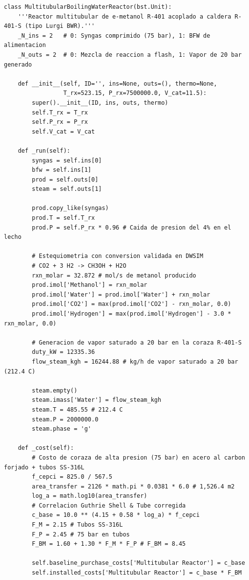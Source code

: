 \documentclass[11pt,letterpaper]{article}
\begin{document}
\begin{lstlisting}[caption={Clase personalizada MultitubularBoilingWaterReactor en BioSTEAM}]
class MultitubularBoilingWaterReactor(bst.Unit):
    '''Reactor multitubular de e-metanol R-401 acoplado a caldera R-401-S (tipo Lurgi BWR).'''
    _N_ins = 2   # 0: Syngas comprimido (75 bar), 1: BFW de alimentacion
    _N_outs = 2  # 0: Mezcla de reaccion a flash, 1: Vapor de 20 bar generado
    
    def __init__(self, ID='', ins=None, outs=(), thermo=None,
                 T_rx=523.15, P_rx=7500000.0, V_cat=11.5):
        super().__init__(ID, ins, outs, thermo)
        self.T_rx = T_rx
        self.P_rx = P_rx
        self.V_cat = V_cat

    def _run(self):
        syngas = self.ins[0]
        bfw = self.ins[1]
        prod = self.outs[0]
        steam = self.outs[1]
        
        prod.copy_like(syngas)
        prod.T = self.T_rx
        prod.P = self.P_rx * 0.96 # Caida de presion del 4% en el lecho
        
        # Estequiometria con conversion validada en DWSIM
        # CO2 + 3 H2 -> CH3OH + H2O
        rxn_molar = 32.872 # mol/s de metanol producido
        prod.imol['Methanol'] = rxn_molar
        prod.imol['Water'] = prod.imol['Water'] + rxn_molar
        prod.imol['CO2'] = max(prod.imol['CO2'] - rxn_molar, 0.0)
        prod.imol['Hydrogen'] = max(prod.imol['Hydrogen'] - 3.0 * rxn_molar, 0.0)
        
        # Generacion de vapor saturado a 20 bar en la coraza R-401-S
        duty_kW = 12335.36
        flow_steam_kgh = 16244.88 # kg/h de vapor saturado a 20 bar (212.4 C)
        
        steam.empty()
        steam.imass['Water'] = flow_steam_kgh
        steam.T = 485.55 # 212.4 C
        steam.P = 2000000.0
        steam.phase = 'g'

    def _cost(self):
        # Costo de coraza de alta presion (75 bar) en acero al carbon forjado + tubos SS-316L
        f_cepci = 825.0 / 567.5
        area_transfer = 2126 * math.pi * 0.0381 * 6.0 # 1,526.4 m2
        log_a = math.log10(area_transfer)
        # Correlacion Guthrie Shell & Tube corregida
        c_base = 10.0 ** (4.15 + 0.58 * log_a) * f_cepci
        F_M = 2.15 # Tubos SS-316L
        F_P = 2.45 # 75 bar en tubos
        F_BM = 1.60 + 1.30 * F_M * F_P # F_BM = 8.45
        
        self.baseline_purchase_costs['Multitubular Reactor'] = c_base
        self.installed_costs['Multitubular Reactor'] = c_base * F_BM
\end{lstlisting}
\end{document}
